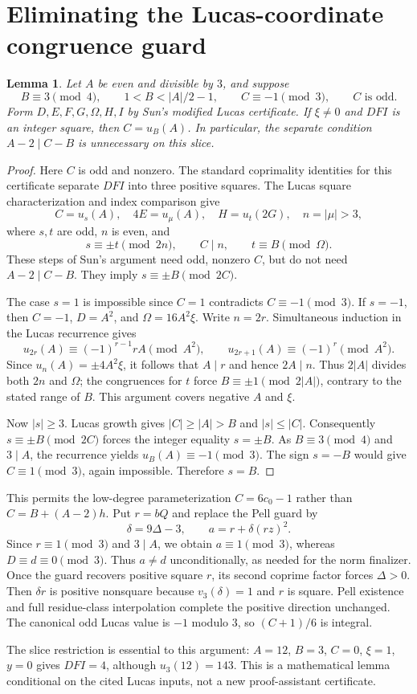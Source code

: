 \section{Eliminating the Lucas-coordinate congruence guard}
\newtheorem{slicelemma}{Lemma}
\begin{slicelemma}
Let $A$ be even and divisible by $3$, and suppose
\[
 B\equiv3\pmod4,\qquad 1<B<|A|/2-1,\qquad C\equiv-1\pmod 3,\qquad C\text{ is odd}.
\]
Form $D,E,F,G,\Omega,H,I$ by Sun's modified Lucas certificate.
If $\xi\ne0$ and $DFI$ is an integer square, then $C=u_B(A)$.
In particular, the separate condition $A-2\mid C-B$ is unnecessary
on this slice.
\end{slicelemma}
\begin{proof}
Here $C$ is odd and nonzero. The standard coprimality identities for
this certificate separate $DFI$ into three positive squares. The Lucas
square characterization and index comparison give
\[
 C=u_s(A),\quad 4E=u_\mu(A),\quad H=u_t(2G),\quad n=|\mu|>3,
\]
where $s,t$ are odd, $n$ is even, and
\[
 s\equiv\pm t\pmod{2n},\qquad C\mid n,\qquad
 t\equiv B\pmod\Omega.
\]
These steps of Sun's argument need odd, nonzero $C$, but do not need
$A-2\mid C-B$. They imply $s\equiv\pm B\pmod{2C}$.

The case $s=1$ is impossible since $C=1$ contradicts
$C\equiv-1\pmod 3$. If $s=-1$, then $C=-1$,
$D=A^2$, and $\Omega=16A^2\xi$. Write $n=2r$. Simultaneous
induction in the Lucas recurrence gives
\[
 u_{2r}(A)\equiv(-1)^{r-1}rA\pmod{A^2},\qquad
 u_{2r+1}(A)\equiv(-1)^r\pmod{A^2}.
\]
Since $u_n(A)=\pm4A^2\xi$, it follows that $A\mid r$ and hence
$2A\mid n$. Thus $2|A|$ divides both $2n$ and $\Omega$; the
congruences for $t$ force $B\equiv\pm1\pmod{2|A|}$, contrary to
the stated range of $B$. This argument covers negative $A$ and $\xi$.

Now $|s|\ge3$. Lucas growth gives $|C|\ge|A|>B$ and
$|s|\le|C|$. Consequently $s\equiv\pm B\pmod{2C}$ forces the
integer equality $s=\pm B$. As $B\equiv3\pmod4$ and $3\mid A$,
the recurrence yields $u_B(A)\equiv-1\pmod 3$. The sign $s=-B$
would give $C\equiv1\pmod 3$, again impossible. Therefore $s=B$.
\end{proof}

This permits the low-degree parameterization $C=6c_0-1$ rather than
$C=B+(A-2)h$. Put $r=bQ$ and replace the Pell guard by
\[
 \delta=9\Delta-3,\qquad a=r+\delta(rz)^2.
\]
Since $r\equiv1\pmod3$ and $3\mid A$, we obtain
$a\equiv1\pmod3$, whereas $D\equiv d\equiv0\pmod3$.
Thus $a\ne d$ unconditionally, as needed for the norm finalizer.
Once the guard recovers positive square $r$, its second coprime factor
forces $\Delta>0$. Then $\delta r$ is positive nonsquare because
$v_3(\delta)=1$ and $r$ is square. Pell existence and full residue-class
interpolation complete the positive direction unchanged. The canonical
odd Lucas value is $-1$ modulo $3$, so $(C+1)/6$ is integral.

The slice restriction is essential to this argument: $A=12$, $B=3$,
$C=0$, $\xi=1$, $y=0$ gives $DFI=4$, although $u_3(12)=143$.
This is a mathematical lemma conditional on the cited Lucas inputs,
not a new proof-assistant certificate.
